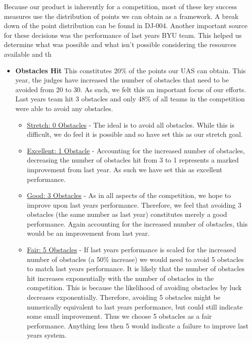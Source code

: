 \documentclass[]{auvsi_doc}
\begin{document}
Because our product is inherently for a competition, most of these key success measures use the distribution of points we can obtain as a framework. A break down of the point distribution can be found in DJ-004. Another important source for these decisions was the performance of last years BYU team. This helped us determine what was possible and what isn't possible considering the resources available and th

\begin{itemize}
\item \textbf{Obstacles Hit} This constitutes 20\% of the points our UAS can obtain. This year, the judges have increased the number of obstacles that need to be avoided from 20 to 30. As such, we felt this an important focus of our efforts. Last years team hit 3 obstacles and only 48\% of all teams in the competition were able to avoid any obstacles. 
	\begin{itemize}
	\item \underline{Stretch: 0 Obstacles} - The ideal is to avoid all obstacles. While this is difficult, we do feel it is possible and so have set this as our stretch goal.
	\item \underline{Excellent: 1 Obstacle} -  Accounting for the increased number of obstacles, decreasing the number of obstacles hit from 3 to 1 represents a marked improvement from last year. As such we have set this as excellent performance.
	\item \underline{Good: 3 Obstacles} -  As in all aspects of the competition, we hope to improve upon last years performance. Therefore, we feel that avoiding 3 obstacles (the same number as last year) constitutes merely a good performance. Again accounting for the increased number of obstacles, this would be an improvement from last year.
	\item  \underline{Fair: 5 Obstacles} -  If last years performance is scaled for the increased number of obstacles (a 50\% increase) we would need to avoid 5 obstacles to match last years performance. It is likely that the number of obstacles hit increases exponentially with the number of obstacles in the competition. This is because the likelihood of avoiding obstacles by luck decreases exponentially. Therefore, avoiding 5 obstacles might be numerically equivalent to last years performance, but could still indicate some small improvement. Thus we choose 5 obstacles as a fair performance. Anything less then 5 would indicate a failure to improve last years system.
	\end{itemize}

\end{itemize}
\end{document}
